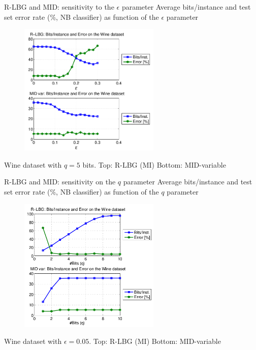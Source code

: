 \documentclass{beamer}
\begin{document}
\begin{frame}{R-LBG and MID: sensitivity to the $\epsilon$ parameter}
Average bits/instance and test set error rate (\%, NB classifier)
as function of the $\epsilon$ parameter
\begin{figure}
	\centering
	\includegraphics[width=0.6\textwidth]{fig4.png}
\end{figure}
{\small Wine dataset with $q=5$ bits. Top: R-LBG (MI) Bottom: MID-variable}
\end{frame}


\begin{frame}{R-LBG and MID: sensitivity on the $q$ parameter}
Average bits/instance and test set error rate (\%, NB classifier)
as function of the $q$ parameter
\begin{figure}
	\centering
	\includegraphics[width=0.6\textwidth]{fig5.png}
\end{figure}
{\small Wine dataset with $\epsilon=0.05$. Top: R-LBG (MI) Bottom: MID-variable}
\end{frame}


\end{document}
